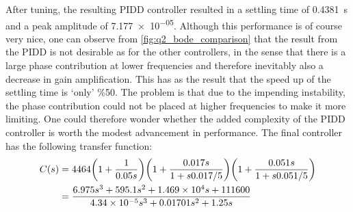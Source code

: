 \noindent After tuning, the resulting PIDD controller resulted in a settling time of \SI{0.4381}{\second} and a peak amplitude of \num{7.177e-05}. 
Although this performance is of course very nice, one can observe from \cref{fig:q2_bode_comparison} that the result from the PIDD is not desirable as for the other controllers, in the sense that there is a large phase contribution at lower frequencies and therefore inevitably also a decrease in gain amplification. This has as the result that the speed up of the settling time is `only' \%50. The problem is that due to the impending instability, the phase contribution could not be placed at higher frequencies to make it more limiting. One could therefore wonder whether the added complexity of the PIDD controller is worth the modest advancement in performance. The final controller has the following transfer function:
$$ 
\begin{aligned}
C(s) &= 4464\qty(1 + \frac{1}{0.05s})
           \qty(1 + \frac{0.017s}{1 + s0.017/5})
           \qty(1 + \frac{0.051s}{1 + s0.051/5})\\
     &= \frac{6.975 s^3 + 595.1 s^2 + \num{1.469e04} s + 111600}{\num{4.34e-05} s^3 + 0.01701 s^2 + 1.25 s}
\end{aligned}
$$